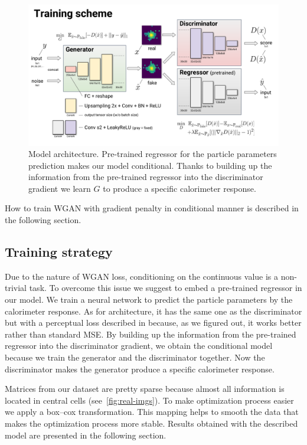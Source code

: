 \begin{figure}
\centering
\includegraphics[width=1\textwidth]{figures/model_architecture.pdf}
\caption{Model architecture. Pre-trained regressor for the particle parameters prediction makes our model conditional. Thanks to building up the information from the pre-trained regressor into the discriminator gradient we learn $G$ to produce a specific calorimeter response.}\label{fig:model}
\end{figure}

How to train WGAN with gradient penalty in conditional manner is described in the following section.

\subsection{Training strategy} \label{sec:training_strategy}
Due to the nature of WGAN loss, conditioning on the continuous value is a non-trivial task. To overcome this issue we suggest to embed a pre-trained regressor in our model. We train a neural network to predict the particle parameters by the calorimeter response. As for architecture, it has the same one as the discriminator but with a perceptual loss described in \cite{johnson2016perceptual} because, as we figured out, it works better rather than standard MSE. By building up the information from the pre-trained regressor into the discriminator gradient, we obtain the conditional model because we train the generator and the discriminator together. Now the discriminator makes the generator produce a specific calorimeter response.

Matrices from our dataset are pretty sparse because almost all information is located in central cells (see~\cref{fig:real-imgs}). To make optimization process easier we apply a box--cox transformation. This mapping helps to smooth the data that makes the optimization process more stable.
Results obtained with the described model are presented in the following section.

